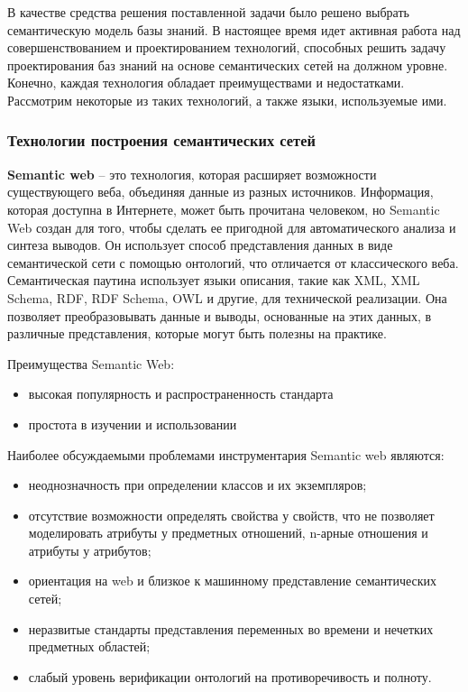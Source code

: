 В качестве средства решения поставленной задачи было решено выбрать семантическую модель базы знаний. В настоящее время идет активная работа над совершенствованием и проектированием технологий, способных решить задачу проектирования баз знаний на основе семантических сетей на должном уровне. Конечно, каждая технология обладает преимуществами и недостатками. Рассмотрим некоторые из таких технологий,
а также языки, используемые ими.

\subsubsection{Технологии построения семантических сетей}

\textbf{Semantic web} -- это технология, которая расширяет возможности существующего веба, объединяя данные из разных источников. Информация, которая доступна в Интернете, может быть прочитана человеком, но Semantic Web создан для того, чтобы сделать ее пригодной для автоматического анализа и синтеза выводов. Он использует способ представления данных в виде семантической сети с помощью онтологий, что отличается от классического веба. Семантическая паутина использует языки описания, такие как XML, XML Schema, RDF, RDF Schema, OWL и другие, для технической реализации. Она позволяет преобразовывать данные и выводы, основанные на этих данных, в различные представления, которые могут быть полезны на практике. \cite{SemanticWeb}

Преимущества Semantic Web:
\begin{itemize}
    \item высокая популярность и распространенность стандарта
    \item простота в изучении и использовании
\end{itemize}

Наиболее обсуждаемыми проблемами инструментария Semantic web являются:
\begin{itemize}
    \item неоднозначность при определении классов и их экземпляров;
    \item отсутствие возможности определять свойства у свойств, что не позволяет моделировать атрибуты у предметных отношений, n-арные отношения и атрибуты у атрибутов;
    \item ориентация на web и близкое к машинному представление семантических сетей;
    \item неразвитые стандарты представления переменных во времени и нечетких предметных областей;
    \item слабый уровень верификации онтологий на противоречивость и полноту. \cite{Kaeshko}
\end{itemize}

